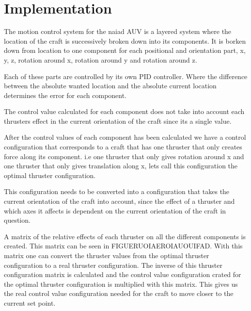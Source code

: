 \section{Implementation}\label{sec:implementation}

The motion control system for the naiad AUV is a layered system where the location of the craft is successively broken down into its components. It is borken down from location to one component for each positional and orientation part, x, y, z, rotation around x, rotation around y and rotation around z. 

Each of these parts are controlled by its own PID controller. Where the difference between the absolute wanted location and the absolute current location determines the error for each component. 

The control value calculated for each component does not take into account each thrusters effect in the current orientation of the craft since its a single value.


After the control values of each component has been calculated we have a control configuration that corresponds to a craft that has one thruster that only creates force along its component. i.e one thruster that only gives rotation around x and one thruster that only gives translation along x, lets call this configuration  the optimal thruster configuration. 

This configuration needs to be converted into a configuration that takes the current orientation of the craft into account, since the effect of a thruster and which axes it affects is dependent on the current orientation of the craft in question. 


A matrix of the relative effects of each thruster on all the different components is created. This matrix can be seen in FIGUERUOIAEROIAUOUIFAD. With this matrix one can convert the thruster values from the optimal thruster configuration to a real thruster configuration. The inverse of this thruster configuration matrix is calculated and the control value configuration crated for the optimal thruster configuration is multiplied  with this matrix. This gives us the real control value configuration needed for the craft to move closer to the current set point.

